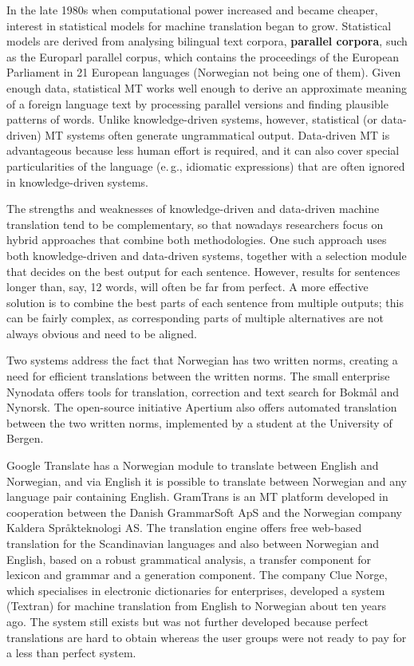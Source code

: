 \begin{multicols}{2}
In the late 1980s when computational power increased and became cheaper, interest in statistical models for machine translation began to grow. Statistical models are derived from analysing bilingual text corpora, \textbf{parallel corpora}, such as the Europarl parallel corpus, which contains the proceedings of the European Parliament in 21 European languages
(Norwegian not being one of them).
Given enough data, statistical MT works well enough to derive an approximate meaning of a foreign language text by processing parallel versions and finding plausible patterns of words. Unlike knowledge-driven systems, however, statistical (or data-driven) MT systems often generate ungrammatical output. Data-driven MT is advantageous because less human effort is required, and it can also cover special particularities of the language (e.\,g., idiomatic expressions) that are often ignored in knowledge-driven systems. 

The strengths and weaknesses of knowledge-driven and data-driven machine translation tend to be complementary, so that nowadays researchers focus on hybrid approaches that combine both methodologies. One such approach uses both knowledge-driven and data-driven systems, together with a selection module that decides on the best output for each sentence. However, results for sentences longer than, say, 12 words, will often be far from perfect. A more effective solution is to combine the best parts of each sentence from multiple outputs; this can be fairly complex, as corresponding parts of multiple alternatives are not always obvious and need to be aligned. 


Two systems address the fact that Norwegian has two written norms, creating a need for efficient translations between the written norms. 
The small enterprise Nynodata offers tools for translation, correction and text search for Bokmål and Nynorsk. 
The open-source initiative Apertium also offers automated translation between the two written norms, implemented by a student at the University of Bergen. 

Google Translate has a Norwegian module to translate between English and Norwegian, and via English it is possible to translate between Norwegian and any language pair containing English. 
GramTrans is an MT platform developed in cooperation between the Danish GrammarSoft ApS and the Norwegian company Kaldera Språkteknologi AS. 
The translation engine offers free web-based translation for the Scandinavian languages and also between Norwegian and English, based on a robust grammatical analysis, a transfer component for lexicon and grammar and a generation component. 
The company Clue Norge, which specialises in electronic dictionaries for enterprises, developed a system (Textran) for machine translation from English to Norwegian about ten years ago. 
The system still exists but was not further developed because perfect translations are hard to obtain whereas the user groups were not ready to pay for a less than perfect system.


\end{multicols}
